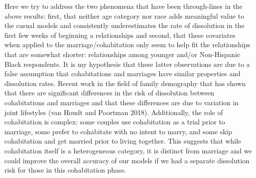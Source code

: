 \documentclass [11pt, proquest] {uwthesis}[2015/03/03]
\begin{document}
Here we try to address the two phenomena that have been through-lines in the above results: first, that neither age category nor race adds meaningful value to the casual models and consistently underestimates the rate of dissolution in the first few weeks of beginning a relationships and second, that these covariates when applied to the marriage/cohabitation only seem to help fit the relationships that are somewhat shorter: relationships among younger and/or Non-Hispanic Black respondents. It is my hypothesis that these latter observations are due to a false assumption that cohabitations and marriages have similar properties and dissolution rates. Recent work in the field of family demography that has shown that there are significant differences in the risk of dissolution between cohabitations and marriages and that these differences are due to variation in joint lifestyles (van Houdt and Poortman 2018). Additionally, the role of cohabitation is complex: some couples use cohabitation as a trial prior to marriage, some prefer to cohabitate with no intent to marry, and some skip cohabitation and get married prior to living together. This suggests that while cohabitation itself is a heterogeneous category, it is distinct from marriage and we could improve the overall accuracy of our models if we had a separate dissolution risk for those in this cohabitation phase.
\end{document}
